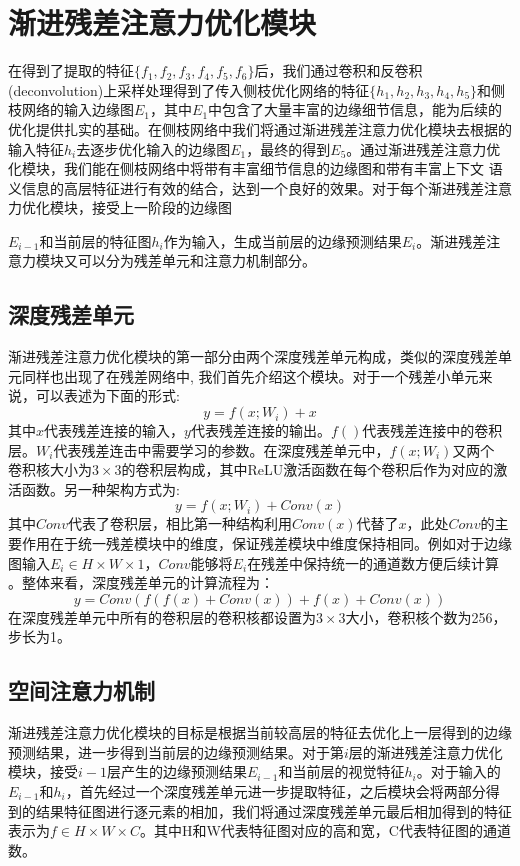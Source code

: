 \documentclass[master]{thesis-uestc}
\begin{document}
\section{渐进残差注意力优化模块}
在得到了提取的特征$\{f_1, f_2, f_3, f_4,  f_5, f_6\}$后，我们通过卷积和反卷积(deconvolution)上采样处理得到了传入侧枝优化网络的特征$\{h_1,h_2, h_3, h_4,  h_5\}$和侧枝网络的输入边缘图$E_1$，其中$E_1$中包含了大量丰富的边缘细节信息，能为后续的优化提供扎实的基础。在侧枝网络中我们将通过渐进残差注意力优化模块去根据的输入特征$h_i$去逐步优化输入的边缘图$E_1$，最终的得到$E_5$。通过渐进残差注意力优化模块，我们能在侧枝网络中将带有丰富细节信息的边缘图和带有丰富上下文 语义信息的高层特征进行有效的结合，达到一个良好的效果。对于每个渐进残差注意力优化模块，接受上一阶段的边缘图{$E_{i-1}$和当前层的特征图$h_i$作为输入，生成当前层的边缘预测结果$E_i$。渐进残差注意力模块又可以分为残差单元和注意力机制部分。

\subsection{深度残差单元}
渐进残差注意力优化模块的第一部分由两个深度残差单元构成，类似的深度残差单元同样也出现了在残差网络中, 我们首先介绍这个模块。对于一个残差小单元来说，可以表述为下面的形式:
\begin{equation}
    y = f(x; W_i) + x
\end{equation}
其中$x$代表残差连接的输入，$y$代表残差连接的输出。$f()$代表残差连接中的卷积层。$W_i$代表残差连击中需要学习的参数。在深度残差单元中，$f(x; W_i)$又两个 卷积核大小为$3 \times 3$的卷积层构成，其中ReLU激活函数在每个卷积后作为对应的激活函数。另一种架构方式为:
\begin{equation}
    y = f(x; W_i) + Conv(x)
\end{equation}
其中$Conv$代表了卷积层，相比第一种结构利用$Conv(x)$代替了$x$，此处$Conv$的主要作用在于统一残差模块中的维度，保证残差模块中维度保持相同。例如对于边缘图输入$E_i \in H \times W \times 1$，$Conv$能够将$E_i$在残差中保持统一的通道数方便后续计算 。整体来看，深度残差单元的计算流程为：
\begin{equation}
    y =  Conv(f(f(x) + Conv(x)) + f(x) + Conv(x))
\end{equation}
在深度残差单元中所有的卷积层的卷积核都设置为$3 \times 3$大小，卷积核个数为256，步长为1。

\subsection{空间注意力机制}
渐进残差注意力优化模块的目标是根据当前较高层的特征去优化上一层得到的边缘预测结果，进一步得到当前层的边缘预测结果。对于第$i$层的渐进残差注意力优化模块，接受$i-1$层产生的边缘预测结果$E_{i-1}$和当前层的视觉特征$h_i$。对于输入的$E_{i-1}$和$h_i$，首先经过一个深度残差单元进一步提取特征，之后模块会将两部分得到的结果特征图进行逐元素的相加，我们将通过深度残差单元最后相加得到的特征表示为$f \in H \times W \times C$。其中H和W代表特征图对应的高和宽，C代表特征图的通道数。

}
\end{document}
